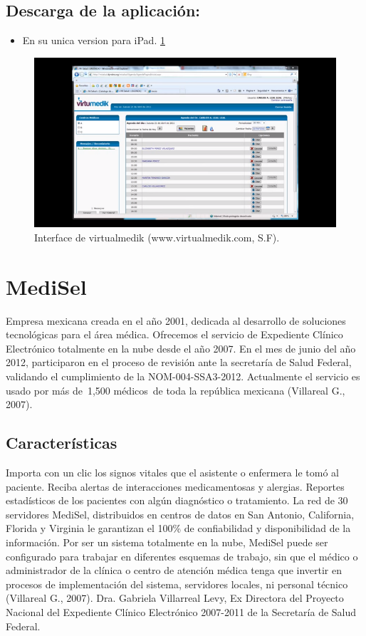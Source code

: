 \subsection{Descarga de la aplicación:}
\begin{itemize}
  \item En su unica version para iPad.
  \ref{figura2}
\end{itemize}

\begin{figure}[h]
  \centering
  \label{figura2}
  \includegraphics[scale=1]{lib/assets/2}
  \caption{Interface de virtualmedik (www.virtualmedik.com, S.F).}
\end{figure}

\section{MediSel}
Empresa mexicana creada en el año 2001, dedicada al desarrollo de soluciones tecnológicas para el área médica.
Ofrecemos el servicio de Expediente Clínico Electrónico totalmente en la nube desde el año 2007. En el mes de junio del año 2012, participaron en el proceso de revisión ante la secretaría de Salud Federal, validando el cumplimiento de la NOM-004-SSA3-2012.
Actualmente el servicio es usado por más de 1,500 médicos de toda la república mexicana (Villareal G., 2007).
\subsection{Características}
Importa con un clic los signos vitales que el asistente o enfermera le tomó al paciente. Reciba alertas de interacciones medicamentosas y alergias. Reportes estadísticos de los pacientes con algún diagnóstico o tratamiento. La red de 30 servidores MediSel, distribuidos en centros de datos en San Antonio, California, Florida y Virginia le garantizan el 100\% de confiabilidad y disponibilidad de la información. Por ser un sistema totalmente en la nube, MediSel puede ser configurado para trabajar en diferentes esquemas de trabajo, sin que el médico o administrador de la clínica o centro de atención médica tenga que invertir en procesos de implementación del sistema, servidores locales, ni personal técnico (Villareal G., 2007).
Dra. Gabriela Villarreal Levy, Ex Directora del Proyecto Nacional del Expediente Clínico Electrónico 2007-2011 de la Secretaría de Salud Federal.

